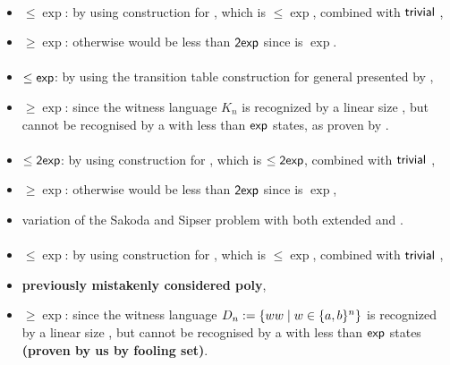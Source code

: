\paragraph{\OMOLA{}\tto\TNFA}
\begin{itemize}
	\item $\le\exp$: by using construction for \hyperref[cost:OM1LAto1NFA]{\OMOLA{}\tto\ONFA}, which is $\le\exp$, combined with $\mathsf{trivial}$ \ONFA{}\tto\TNFA,
	\item $\ge\exp$: otherwise \hyperref[cost:OM1LAto1DFA]{\OMOLA{}\tto\ODFA} would be less than $\mathsf{2exp}$ since \hyperref[cost:2NFAto1DFA]{\TNFA{}\tto\ODFA} is $\exp$.
\end{itemize}
\paragraph{\OMODLA{}\tto\ODFA}\label{cost:OM1DLAto1DFA}
\begin{itemize}
	\item $\le\mathsf{exp}$: by using the transition table construction for general \ODLA presented by ,
	\item $\ge\exp$: since the witness language $K_n$ is recognized by a linear size \OMODLA, but cannot be recognised by a \TNFA with less than $\mathsf{exp}$ states, as proven by .
\end{itemize}
\paragraph{\OMOLA{}\tto\OMODLA}
\begin{itemize}
	\item $\le\mathsf{2exp}$: by using construction for \hyperref[cost:OM1LAto1DFA]{\OMOLA{}\tto\ODFA}, which is $\le\mathsf{2exp}$, combined with $\mathsf{trivial}$ \ODFA{}\tto\OMODLA,
	\item $\ge\exp$: otherwise \hyperref[cost:OM1LAto1DFA]{\OMOLA{}\tto\ODFA} would be less than $\mathsf{2exp}$ since \hyperref[cost:OM1DLAto1DFA]{\OMODLA{}\tto\ODFA} is $\exp$,
	\item variation of the Sakoda and Sipser problem with both extended \TNFA and \TDFA.
\end{itemize}
\paragraph{\OMODLA{}\tto\ONFA}
\begin{itemize}
	\item $\le\exp$: by using construction for \hyperref[cost:OM1DLAto1DFA]{\OMODLA{}\tto\ODFA}, which is $\le\exp$, combined with $\mathsf{trivial}$ \ODFA{}\tto\ONFA,
	\item \textbf{previously mistakenly considered poly},
	\item $\ge\exp$: since the witness language $D_n:=\{ww\mid w\in\{a,b\}^n\}$ is recognized by a linear size \OMODLA, but cannot be recognised by a \ONFA with less than $\mathsf{exp}$ states \textbf{(proven by us by fooling set)}.
\end{itemize}
